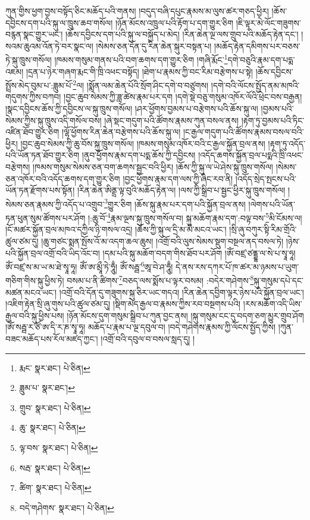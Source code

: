 ཀུན་གྱིས་ཕྱག་བྱས་བསྟོད་ཅིང་མཆོད་པའི་གནས། །བདུད་བཞི་དཔུང་རྣམས་མ་ལུས་ཚར་གཅད་ཕྱིར། །ཆོས་དབྱིངས་དག་པའི་སྐུ་ལ་ཁྲུས་ཆབ་གསོལ། །ཉོན་མོངས་འཁྲུལ་པའི་རྟོག་པ་དག་གྱུར་ཅིག །ཇི་ལྟར་མེ་ལོང་གཟུགས་བརྙན་སྣང་གྱུར་ཡང་། །ཆོས་དབྱིངས་དག་པའི་སྐུ་ལ་བསྐྱོད་པ་མེད། །རིན་ཆེན་ལྔ་ལས་གྲུབ་པའི་མཆོད་རྟེན་དང་། །སའམ་ཆུའམ་འོན་ཏེ་བར་སྣང་ལ། །སེམས་ཅན་དོན་དུ་རིན་ཆེན་སྐུར་བསྟན་པ། །མཆོད་རྟེན་དམིགས་པར་བཅས་ཏེ་སྐུ་ཁྲུས་གསོལ། །ཁམས་གསུམ་གནས་པའི་བག་ཆགས་དག་གྱུར་ཅིག །གཞི་རྨོང་\footnote{རྨང་  སྣར་ཐང་།  པེ་ཅིན། }དགེ་བཅུའི་རྣམ་དག་པདྨ་འཇམ། །དྲན་པ་ཉེར་གཞག་རྨང་གི་ཁྲི་འཕང་བསྟོད། །ཐེག་པ་རྣམས་ཀྱི་བང་རིམ་བརྩེགས་པ་སྟེ། །ཆོས་དབྱིངས་སྤྲོས་མེད་བུམ་པ་:ཟླུམ་པོ་\footnote{ཟླུམ་པ་  སྣར་ཐང་། }ལ། །སྨོན་ལམ་ཆེན་པོའི་སྲོག་ཤིང་དགེ་བ་བཙུགས། །དགེ་བའི་ལོངས་སྤྱོད་ནམ་མཁའི་གདུགས་ཀྱིས་བཀབ། །བྱང་ཆུབ་སེམས་ཀྱི་ཟླ་ཚེས་རྣམ་པར་དག །དགེ་སྡེ་བཅུ་གསུམ་འཁོར་ལོའི་ཕྲེང་བས་བརྒྱན། །སྣང་དབྱིངས་ཆོས་ཀྱི་དབྱིངས་ལ་སྐུ་ཁྲུས་གསོལ། །ཤར་ཕྱོགས་བྱམས་པ་བརྩེགས་པའི་ཆོས་སྐུ་ལ། །བྱམས་པའི་སེམས་ཀྱིས་སྐུ་ཁྲུས་འདི་གསོལ་བས། །ཞེ་སྡང་གདུག་པའི་ཚོགས་རྣམས་ཀུན་བསལ་ནས། །རྟག་ཏུ་བྱམས་པའི་ཏིང་འཛིན་ཐོབ་གྱུར་ཅིག །ལྷོ་ཕྱོགས་རིན་ཆེན་བརྩེགས་པའི་ཆོས་སྐུ་ལ། །ང་རྒྱལ་གདུག་པའི་ཚོགས་རྣམས་བསལ་བའི་ཕྱིར། །བྱང་ཆུབ་སེམས་ཀྱི་ཆུ་བོས་སྐུ་ཁྲུས་གསོལ། །ཁམས་གསུམ་འཁོར་བའི་ང་རྒྱལ་སྐྱོན་བྲལ་ནས། །རྟག་ཏུ་འདོད་པའི་ཡོན་ཏན་ཐོབ་གྱུར་ཅིག །ནུབ་ཕྱོགས་རྣམ་དག་པདྨ་ཆོས་ཀྱི་དབྱིངས། །འདོད་ཆགས་སྐྱོན་བྲལ་པདྨའི་ཁྲི་འཕང་བརྩེགས། །ཁམས་གསུམ་སེམས་ཅན་བག་ཆགས་སྦྱང་བའི་ཕྱིར། །ཆོས་ཀྱི་སྐུ་ལ་ཡེ་ཤེས་སྐུ་ཁྲུས་གསོལ། །སེམས་ཅན་འཁོར་བའི་འདོད་ཆགས་དག་གྱུར་ཅིག །བྱང་ཕྱོགས་རྣམ་དག་ལས་ཀྱི་ཞིང་རབ་ནི། །འདོད་སྲེད་སྤངས་པའི་ཡོན་ཏན་རྫོགས་པས་སྟོན། །རིན་ཆེན་ཨིནྡྲ་ལྟ་བུའི་མཆོད་རྟེན་ལ། །ལས་ཀྱི་སྒྲིབ་པ་སྦྱང་ཕྱིར་སྐུ་ཁྲུས་གསོལ། །སེམས་ཅན་རྣམས་ཀྱི་འདོད་པ་འགྲུབ་\footnote{གྲུབ་  སྣར་ཐང་།  པེ་ཅིན། }གྱུར་ཅིག །ཆོས་སྐུ་རྣམ་པར་དག་པའི་སྐྱོན་བྲལ་ནས། །ལེགས་པའི་ཡོན་ཏན་ཕུན་སུམ་ཚོགས་པར་ཤོག །:ཆུ་བོ་\footnote{ཆུ་  སྣར་ཐང་།  པེ་ཅིན། }རྣམ་ལྔས་སྐུ་ཁྲུས་གསོལ་བ། སྐུ་མཆོག་རྣམ་དག་:བལྟ་བས་\footnote{ལྟ་བས་  སྣར་ཐང་།  པེ་ཅིན། }མི་ངོམས་ལ། །ངོ་མཚར་སྐྱོན་བྲལ་མཁའ་དཀྱིལ་ཉི་གསལ་འདྲ། །ཆོས་ཀྱི་སྐུ་ལ་དྲི་མ་མི་མངའ་ཡང་། །སྲི་ཞུ་བཀུར་སྟི་རིམ་གྲོའི་ཚུལ་ཙམ་དུ། །ཆུ་གཙང་སྨན་སྤོས་འོ་མ་འདག་ཆལ་ཆུས། །འགྲོ་བའི་ལུས་སེམས་སྡུག་བསྔལ་ནད་བསལ་ཏེ། །ཉེས་པའི་སྐྱོན་བྲལ་འགྲོ་བའི་ཡིད་འོང་བ། །དམ་པའི་སྐུ་མཆོག་བདག་གིས་ཐོབ་པར་ཤོག །ཨོཾ་བཛྲ་ཙནྡྷ་ལ་སེ་པ་སྭཱ་ཧཱ། ཨོཾ་བཛྲ་ས་མ་ཡ་མ་ཐེ་སྭཱ་ཧཱ། ཨོཾ་ཨ་མྲཱྀ་ཏེ་ཧཱུྃ། ཨོཾ་སརྦྦ་\footnote{སརྦ་  སྣར་ཐང་།  པེ་ཅིན། }ཨཱ་བེ་ཤ་ཧཱུྃ། དེ་ནས་རས་དཀར་པོ་ཁ་ཚར་མ་ཉམས་པ་ཡུག་གཅིག་གིས་སྐུ་ཕྱིས་ཏེ། བསམ་པ་ནི་ཚིགས་\footnote{ཚིག་  སྣར་ཐང་།  པེ་ཅིན། }བཅད་ལས་སྨོས་པ་ལྟར་བསམ། :བདེར་གཤེགས་\footnote{བདེ་གཤེགས་  སྣར་ཐང་།  པེ་ཅིན། }སྐུ་གསུམ་དཔེ་དང་མཚན་མངའ་ཡང་། །འགྲོ་བའི་དོན་དུ་གཟུགས་སྐུ་ཅིར་ཡང་གདའ། །རིན་ཆེན་དབྱིག་ལྟར་ཉེས་པའི་སྐྱོན་བྲལ་ཡང་། །འཇིག་རྟེན་སྲི་ཞུ་གུས་པའི་ཚུལ་ཙམ་དུ། །སྡིག་མེད་རྒྱལ་བ་རྣམས་ཀྱིས་རབ་བསྔགས་པའི། །རས་མཆོག་འདི་ཡིས་རྒྱལ་བའི་སྐུ་ཕྱིས་པས། །ཉོན་མོངས་དུག་གསུམ་སྒྲིབ་པ་ཀུན་བྱང་ནས། །སྐུ་གསུམ་ངང་དུ་བདག་ཅག་མྱུར་གྲུབ་ཤོག །ཨོཾ་སརྦྦ་ར་ཙོ་ཨ་དི་ར་ཎ་སྭཱ་ཧཱ། མཆོད་པ་རྣམ་པ་ལྔ་དབུལ་བ། །བདེ་གཤེགས་རྣམས་ཀྱི་ལོངས་སྤྱོད་ཀྱིས། །ཀུན་བཟང་མཆོད་པས་རོལ་མཛད་ཀྱང་། །འགྲོ་བའི་དབུལ་བ་བསལ་སླད་དུ། །
